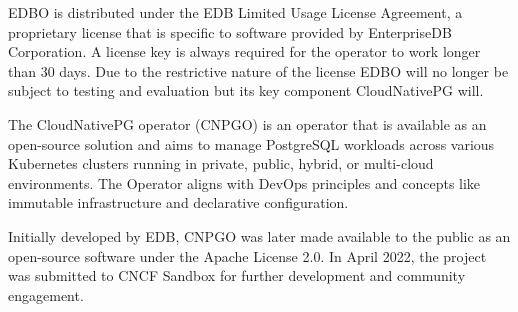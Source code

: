 EDBO is distributed under the EDB Limited Usage License Agreement, a proprietary license that is specific to software provided by EnterpriseDB Corporation. A license key is always required for the operator to work longer than 30 days. \cite{EDBdocuLicence} Due to the restrictive nature of the license EDBO will no longer be subject to testing and evaluation but its key component CloudNativePG will.

\pagebreak

The CloudNativePG operator (CNPGO) is an operator that is available as an open-source solution and aims to manage PostgreSQL workloads across various Kubernetes clusters running in private, public, hybrid, or multi-cloud environments. The Operator aligns with DevOps principles and concepts like immutable infrastructure and declarative configuration. \cite{CNPGdocu}

Initially developed by EDB, CNPGO was later made available to the public as an open-source software under the Apache License 2.0. In April 2022, the project was submitted to CNCF Sandbox for further development and community engagement. \cite{CNPGdocu}

